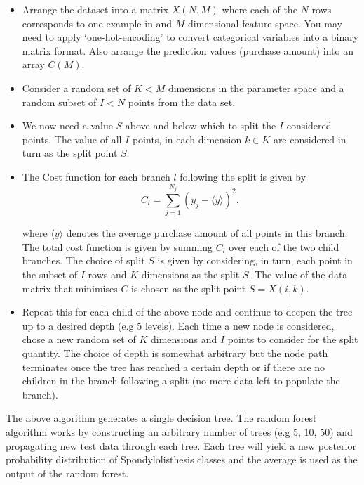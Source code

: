 \documentclass[10pt]{article}
\begin{document}
\begin{itemize}
\item Arrange the dataset into a matrix $X(N,M)$ where each of the $N$ rows corresponds to one example in and $M$ dimensional feature space. You may need to apply `one-hot-encoding' to convert categorical variables into a binary matrix format. Also arrange the prediction values (purchase amount) into an array $C(M)$.


\item Consider a random set of $K < M$ dimensions in the parameter space and a random subset of $I<N$ points from the data set. 

\item We now need a value $S$ above and below which to split the $I$ considered points. The value of all $I$ points, in each dimension $k \in K$ are considered in turn as the split point $S$.

\item The Cost function for each branch $l$ following the split is given by
\begin{equation}
C_l = \sum_{j=1}^{N_j} \left( y_j - \langle y \rangle \right)^2,
\end{equation}

\noindent where $\langle y \rangle$ denotes the average purchase amount of all points in this branch. The total cost function is given by summing $C_l$ over each of the two child branches. The choice of split $S$ is given by considering, in turn, each point in the subset of $I$ rows and $K$ dimensions as the split $S$. The value of the data matrix that minimises $C$ is chosen as the split point $S = X(i,k)$.


\item Repeat this for each child of the above node and continue to deepen the tree up to a desired depth (e.g 5 levels). Each time a new node is considered, chose a new random set of $K$ dimensions and $I$ points to consider for the split quantity. The choice of depth is somewhat arbitrary but the node path terminates once the tree has reached a certain depth or if there are no children in the branch following a split (no more data left to populate the branch).

\end{itemize}

The above algorithm generates a single decision tree. The random forest algorithm works by constructing an arbitrary number of trees (e.g 5, 10, 50) and propagating new test data through each tree. Each tree will yield a new posterior probability distribution of Spondylolisthesis classes and the average is used as the output of the random forest. 
\end{document}
